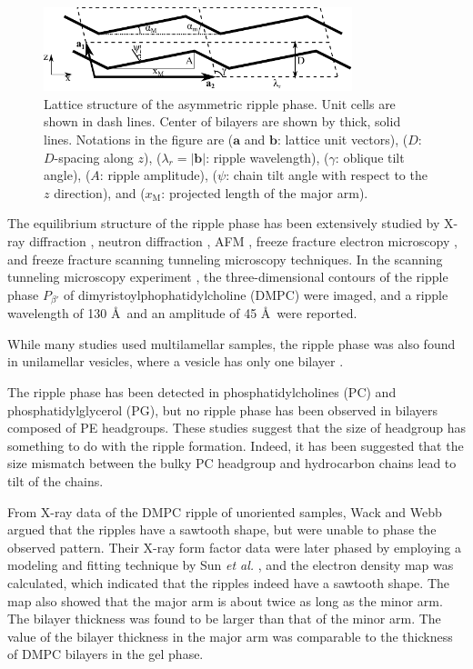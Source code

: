 \begin{figure}[htbp]
  \centering
  \includegraphics[width=0.8\textwidth]{figures/ripple/unit_cell}
  \caption{Lattice structure of the asymmetric ripple phase. Unit cells are shown in
  dash lines. Center of bilayers are shown by thick, solid lines. Notations 
  in the figure are ($\mathbf{a}$ and $\mathbf{b}$: lattice unit vectors),
  ($D$: $D$-spacing along $z$), ($\lambda_r=|\mathbf{b}|$: ripple wavelength), 
  ($\gamma$: oblique tilt angle), ($A$: ripple amplitude),
  ($\psi$: chain tilt angle with respect to the $z$ direction),
  and ($x_\textrm{M}$: projected length of the major arm).}
  \label{fig:unit_cell}
\end{figure}

The equilibrium structure of the ripple phase has been extensively studied by
X-ray diffraction \cite{ref:Janiak76,ref:Janiak79,ref:Tardieu73,ref:Wack89,ref:Yao91,ref:Sun96,ref:Cunningham98},
neutron diffraction \cite{ref:Mortensen88,ref:Bradshaw89}, 
AFM \cite{}, freeze fracture electron microscopy \cite{ref:Woodward96},
and freeze fracture scanning tunneling microscopy \cite{} techniques.
In the scanning tunneling microscopy experiment \cite{ref:Zasadzinski88}, 
the three-dimensional contours of the ripple phase $P_{\beta'}$ of
dimyristoylphophatidylcholine (DMPC) were imaged, and
a ripple wavelength of 130 \AA\ and an amplitude of 45 \AA\ were reported.

While many studies used multilamellar samples, the ripple phase was also found in
unilamellar vesicles, where a vesicle has only one bilayer 
\cite{ref:Mason99}.

The ripple phase has been detected in
phosphatidylcholines (PC) and phosphatidylglycerol (PG),
but no ripple phase has been observed in bilayers composed of PE headgroups.
These studies suggest that the size of headgroup has something to do with
the ripple formation. Indeed, it has been suggested that the size mismatch
between the bulky PC headgroup and hydrocarbon chains lead to tilt of 
the chains. 

From X-ray data of the DMPC ripple of unoriented samples, 
Wack and Webb \cite{ref:Wack89} argued that the ripples have a sawtooth shape,
but were unable to phase the observed pattern.
Their X-ray form factor data were later
phased by employing a modeling and fitting technique by Sun \textit{et al.}
\cite{ref:Sun96}, and the electron density map was calculated, which indicated that  
the ripples indeed have a sawtooth shape. The map also showed that
the major arm is about twice as long as the minor arm. The bilayer
thickness was found to be larger than that of the minor arm. The
value of the bilayer thickness in the major arm was comparable to the
thickness of DMPC bilayers in the gel phase.

